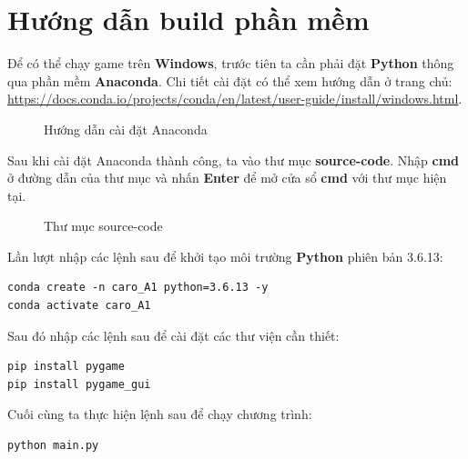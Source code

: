 \section{Hướng dẫn build phần mềm}

Để có thể chạy game trên \textbf{Windows}, trước tiên ta cần phải đặt \textbf{Python} thông qua phần mềm \textbf{Anaconda}. Chi tiết cài đặt có thể xem hướng dẫn ở trang chủ: \url{https://docs.conda.io/projects/conda/en/latest/user-guide/install/windows.html}.
\begin{figure}[H]
\caption{Hướng dẫn cài đặt Anaconda}
\end{figure}

Sau khi cài đặt Anaconda thành công, ta vào thư mục \textbf{source-code}. Nhập \textbf{cmd} ở đường dẫn của thư mục và nhấn \textbf{Enter} để mở cửa sổ \textbf{cmd} với thư mục hiện tại.
\begin{figure}[H]
\caption{Thư mục source-code}
\end{figure}

Lần lượt nhập các lệnh sau để khởi tạo môi trường \textbf{Python} phiên bản 3.6.13:
\begin{lstlisting}
conda create -n caro_A1 python=3.6.13 -y
conda activate caro_A1
\end{lstlisting}

Sau đó nhập các lệnh sau để cài đặt các thư viện cần thiết:
\begin{lstlisting}
pip install pygame
pip install pygame_gui
\end{lstlisting}

Cuối cùng ta thực hiện lệnh sau để chạy chương trình:
\begin{lstlisting}
python main.py
\end{lstlisting}